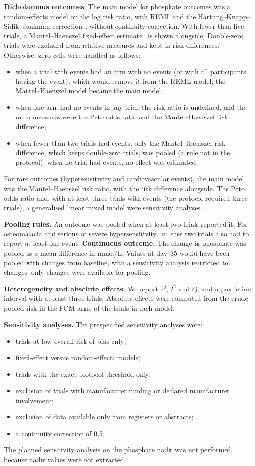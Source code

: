 \documentclass[11pt,a4paper]{article}
\begin{document}
\textbf{Dichotomous outcomes.} The main model for phosphate outcomes was a random-effects model on the log risk ratio, with REML and the Hartung--Knapp--Sidik--Jonkman correction~\cite{IntHout2014}, without continuity correction. With fewer than five trials, a Mantel--Haenszel fixed-effect estimate~\cite{Mantel1959} is shown alongside. Double-zero trials were excluded from relative measures and kept in risk differences. Otherwise, zero cells were handled as follows:
\begin{itemize}
\item when a trial with events had an arm with no events (or with all participants having the event), which would remove it from the REML model, the Mantel--Haenszel model became the main model;
\item when one arm had no events in any trial, the risk ratio is undefined, and the main measures were the Peto odds ratio and the Mantel--Haenszel risk difference;
\item when fewer than two trials had events, only the Mantel--Haenszel risk difference, which keeps double-zero trials, was pooled (a rule not in the protocol); when no trial had events, no effect was estimated.
\end{itemize}
For rare outcomes (hypersensitivity and cardiovascular events), the main model was the Mantel--Haenszel risk ratio, with the risk difference alongside. The Peto odds ratio and, with at least three trials with events (the protocol required three trials), a generalised linear mixed model were sensitivity analyses~\cite{Bradburn2007}.

\textbf{Pooling rules.} An outcome was pooled when at least two trials reported it. For osteomalacia and serious or severe hypersensitivity, at least two trials also had to report at least one event. 
\textbf{Continuous outcome.} The change in phosphate was pooled as a mean difference in mmol/L. Values at day~35 would have been pooled with changes from baseline, with a sensitivity analysis restricted to changes; only changes were available for pooling.

\textbf{Heterogeneity and absolute effects.} We report $\tau^2$, $I^2$ and $Q$, and a prediction interval with at least three trials. Absolute effects were computed from the crude pooled risk in the FCM arms of the trials in each model.

\textbf{Sensitivity analyses.} The prespecified sensitivity analyses were:
\begin{itemize}
\item trials at low overall risk of bias only;
\item fixed-effect versus random-effects models;
\item trials with the exact protocol threshold only;
\item exclusion of trials with manufacturer funding or declared manufacturer involvement;
\item exclusion of data available only from registers or abstracts;
\item a continuity correction of 0.5.
\end{itemize}
The planned sensitivity analysis on the phosphate nadir was not performed, because nadir values were not extracted.
\end{document}
